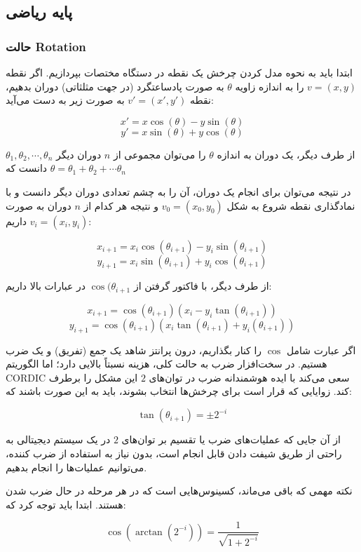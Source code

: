 \documentclass[12pt,titlepage,a4page , tikz , multi,table , svgnames,xcdraw]{article}
\begin{document}
\newpage

\subsection{پایه ریاضی}

\subsubsection{حالت Rotation}
ابتدا باید به نحوه مدل کردن چرخش یک نقطه در دستگاه مختصات بپردازیم. اگر نقطه $v = (x , y)$ را به اندازه زاویه $\theta$ به صورت پادساعتگرد (در جهت مثلثاتی) دوران بدهیم، نقطه $v' = (x' , y')$ به صورت زیر به دست می‌آید:

$$x' = x \cos(\theta) - y \sin(\theta)$$
$$y' = x \sin (\theta) + y \cos (\theta) $$

از طرف دیگر، یک دوران به اندازه $\theta$ را می‌توان مجموعی از $n$ دوران دیگر $\theta_1 , \theta_2 , \cdots , \theta_n$ دانست که $\theta = \theta_1 + \theta_2 + \cdots \theta_n$

در نتیجه می‌توان برای انجام یک دوران، آن را به چشم تعدادی دوران دیگر دانست و با نمادگذاری نقطه شروع به شکل $v_0 = (x_0 , y_0)$ و نتیجه هر کدام از $n$ دوران به صورت $v_i = (x_i , y_i)$ داریم:

$$x_{i+1} = x_{i} \cos(\theta_{i+1}) - y_{i} \sin(\theta_{i+1})$$
$$y_{i+1} = x_{i} \sin (\theta_{i+1}) + y_{i} \cos (\theta_{i+1}) $$

از طرف دیگر، با فاکتور گرفتن از $\cos(\theta_{i+1}$ در عبارات بالا داریم:

$$x_{i+1} =\cos(\theta_{i+1})( x_{i}  - y_{i} \tan(\theta_{i+1}))$$
$$y_{i+1} = \cos(\theta_{i+1})(x_{i} \tan (\theta_{i+1}) + y_{i}  (\theta_{i+1})) $$

اگر عبارت شامل $\cos$ را کنار بگذاریم، درون پرانتز شاهد یک جمع (تفریق) و یک ضرب هستیم. در سخت‌افزار ضرب به حالت کلی، هزینه نسبتاً بالایی دارد؛ اما الگوریتم CORDIC سعی می‌کند با ایده هوشمندانه ضرب در توان‌های $2$ این مشکل را برطرف کند. زوایایی که قرار است برای چرخش‌ها انتخاب بشوند، باید به این صورت باشند که:

$$\tan (\theta_{i+1}) = \pm 2^{-i}$$

از آن جایی که عملیات‌های ضرب یا تقسیم بر توان‌های $2$ در یک سیستم دیجیتالی به راحتی از طریق شیفت دادن قابل انجام است، بدون نیاز به استفاده از ضرب کننده، می‌توانیم عملیات‌ها را انجام بدهیم.

نکته مهمی که باقی می‌ماند، کسینوس‌هایی است که در هر مرحله در حال ضرب شدن هستند. ابتدا باید توجه کرد که:

$$\cos (\arctan (2 ^{-i})) = \frac{1}{\sqrt{1 + 2^{-i}}}$$
\end{document}
